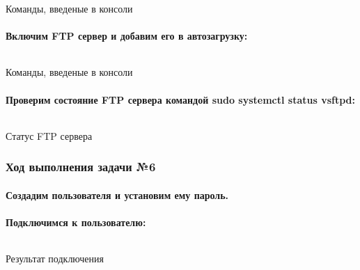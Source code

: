 \begin{code}
	\inputminted[breaklines=true, xleftmargin=1em, linenos, frame=single, framesep=10pt, fontsize=\footnotesize, firstline=1, lastline=33]{haskell}{fig/vsftpd_ports.bash}
	\caption{Команды, введеные в консоли}
\end{code}

\paragraph{Включим FTP сервер и добавим его в автозагрузку:}

\begin{code}
	\inputminted[breaklines=true, xleftmargin=1em, linenos, frame=single, framesep=10pt, fontsize=\footnotesize, firstline=1, lastline=33]{haskell}{fig/vsftpd_enable.bash}
	\caption{Команды, введеные в консоли}
\end{code}

\paragraph{Проверим состояние FTP сервера командой \textbf{sudo systemctl status vsftpd}:}

\begin{code}
	\inputminted[breaklines=true, xleftmargin=1em, linenos, frame=single, framesep=10pt, fontsize=\footnotesize, firstline=1, lastline=33]{haskell}{fig/vsftpd_status.bash}
	\caption{Статус FTP сервера}
\end{code}

\subsubsection{Ход выполнения задачи №6}

\paragraph{Создадим пользователя и установим ему пароль.}

\paragraph{Подключимся к пользователю:}

\begin{code}
	\inputminted[breaklines=true, xleftmargin=1em, linenos, frame=single, framesep=10pt, fontsize=\footnotesize, firstline=1, lastline=33]{haskell}{fig/end.bash}
	\caption{Результат подключения}
\end{code}

